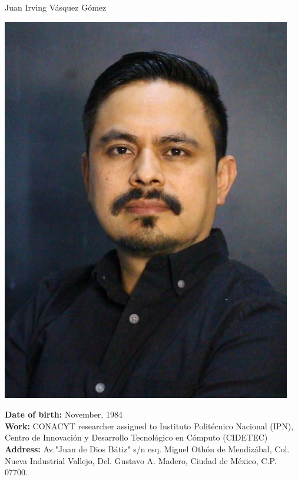 \documentclass[10pt]{article}
\begin{document}
	
	\begin{center}
		{\huge Juan Irving Vásquez Gómez}
		\vspace{0.5cm}
		
		\begin{minipage}[b]{0.3\linewidth}
			\centering
			\includegraphics[width=\textwidth]{jivg36}
		\end{minipage}
		\hspace{0.5cm}
		\begin{minipage}[b]{0.6\linewidth}
			\textbf{Date of birth:} November, 1984 \\
			\textbf{Work:} CONACYT researcher assigned to Instituto Politécnico Nacional (IPN), 
			Centro de Innovación y Desarrollo Tecnológico en Cómputo (CIDETEC) \\ 
			\textbf{Address:} Av."Juan de Dios Bátiz" s/n esq. Miguel Othón de Mendizábal, 
			Col. Nueva Industrial Vallejo, Del. Gustavo A. Madero, Ciudad de México, C.P. 07700. \\

\end{minipage}
\end{center}
\end{document}
